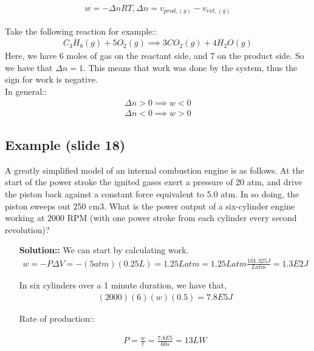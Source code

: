 \documentclass[12pt]{article}
\begin{document}
\begin{align*}
    w=-\Delta nRT, \Delta n=v_{prod,(g)}-v_{rxt,(g)}
\end{align*}

Take the following reaction for example::
\begin{align*}
    C_3H_8(g)+5O_2(g)\implies3CO_2(g)+4H_2O(g)
\end{align*}
Here, we have 6 moles of gas on the reactant side, and 7 on the product side. So we have that $\Delta n=1$. This means that work was done by the system, thus the sign for work is negative.\\In general::
\begin{align*}
    \Delta n>0\implies w<0\\
    \Delta n<0\implies w>0
\end{align*}

\subsection*{Example (slide 18)}
A greatly simplified model of an internal combustion engine is as follows. At the
start of the power stroke the ignited gases exert a pressure of 20 atm, and drive the
piston back against a constant force equivalent to 5.0 atm. In so doing, the piston
sweeps out 250 cm3. What is the power output of a six-cylinder engine working at
2000 RPM (with one power stroke from each cylinder every second revolution)?

\begin{itemize}
    \item[\textbf{Solution::}] We can start by calculating work.
    \begin{align*}
        w=-P\Delta V=-(5atm)(0.25L)=1.25Latm=1.25Latm\frac{101.325J}{Latm}=1.3E2J
    \end{align*}

    In six cylinders over a 1 minute duration, we have that,
    \begin{align*}
        (2000)(6)(w)(0.5)=7.8E5J
    \end{align*}

    Rate of production::

    \begin{align*}
        P=\frac{w}{t}=\frac{7.8E5}{60s}=13LW
    \end{align*}
\end{itemize}
\end{document}
